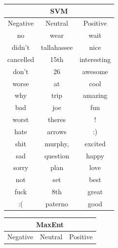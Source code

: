 \begin{table}[!htb]
	
	\begin{minipage}{.45\linewidth}
		\begin{tabular}{|c|c|c|}
		
		\multicolumn{3}{c}{SVM} \\ \hline
		
		Negative & Neutral & Positive \\ \hline\hline
		
		no  		& wear & wait \\ \hline
		didn't  	& tallahassee & nice \\ \hline
		cancelled  	& 15th & interesting \\ \hline
		don't  		& 26 & awesome \\ \hline
		worse  		& at & cool \\ \hline
		why  		& trip & amazing \\ \hline
		bad  		& joe & fun \\ \hline
		worst  		& theres & ! \\ \hline
		hate  		& arrows & :) \\ \hline
		shit  		& murphy, & excited \\ \hline
		sad  		& question & happy \\ \hline
		sorry  		& plan & love \\ \hline
		not  		& set & best \\ \hline
		fuck  		& 8th & great \\ \hline
		:(  		& paterno & good \\ \hline
		\end{tabular}
	\end{minipage}
	\hspace{0.05\linewidth}
	\begin{minipage}{.45\linewidth}
		\begin{tabular}{|c|c|c|}

		
		\multicolumn{3}{c}{MaxEnt} \\ \hline
		
		Negative & Neutral & Positive \\ \hline\hline
		

\end{tabular}
\end{minipage}
\end{table}
